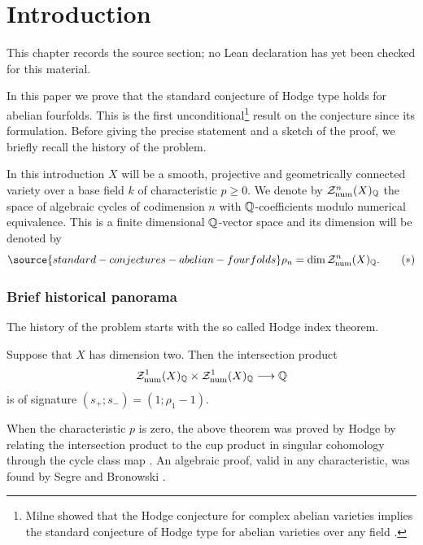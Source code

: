\chapter{Introduction}
\label{standard-conjectures-abelian-fourfolds-chapter-01}

\begin{remark}
\label{standard-conjectures-abelian-fourfolds-chapter-01-source}
This chapter records the source section; no Lean declaration has yet been checked for this material.
\notready
\end{remark}

In this paper we prove that the standard conjecture of Hodge type holds for abelian fourfolds. This is the first  unconditional\footnote{Milne showed that the   Hodge conjecture for complex abelian varieties  implies the standard conjecture of Hodge type for abelian varieties over any field \cite{pola}.}  result on the conjecture since its formulation. Before giving the precise statement and a sketch of the proof, we briefly recall the history of the problem.



In this introduction $X$ will be a smooth, projective and geometrically connected variety over a base field $k$ of characteristic $p\geq 0$. We denote by  $\mathcal{Z}_{\mathrm{num}}^n(X)_{\mathbb{Q}}$ the space of algebraic cycles of codimension $n$ with $\mathbb{Q}$-coefficients modulo numerical equivalence. This is a finite dimensional {$\mathbb{Q}$-vector} space and its dimension will be denoted by
\begin{equation} \label{eq:intro}
\source{standard-conjectures-abelian-fourfolds}
\rho_n=\dim \mathcal{Z}_{\num}^n(X)_{\Q}. \tag{$*$}
\end{equation}

\subsection*{Brief historical panorama}
The history of the problem starts with the so called Hodge index  theorem.
\begin{theorem}
\notready\label{introsegre}
Suppose that $X$ has dimension two. Then the intersection product
\[\mathcal{Z}^1_{\mathrm{num}}(X)_{\mathbb{Q}}\times \mathcal{Z}_{\mathrm{num}}^1(X)_{\mathbb{Q}} \longrightarrow \mathbb{Q}\]
is of signature $(s_+ ; s_-)=(1; \rho_1 - 1)$.
\end{theorem}
When the characteristic $p$ is zero, the above theorem was proved by Hodge by relating  the intersection product to the cup product in singular cohomology through the cycle class map \cite{Hodge}. An algebraic proof, valid in any characteristic,  was found by Segre \cite{Segre} and Bronowski \cite{Brono}.

